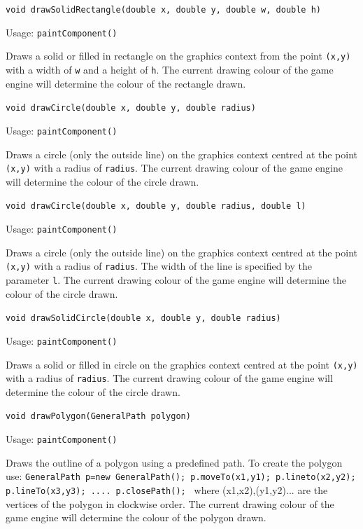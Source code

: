 \documentclass[a4paper, 10pt]{report}
\begin{document}
\hrulefill

{\large {\tt void drawSolidRectangle(double x, double y, double w, double h)}}

Usage: {\tt paintComponent()}

Draws a solid or filled in rectangle on the graphics context from the point {\tt (x,y)} with a width of {\tt w} and a height of {\tt h}. The current drawing colour of the game engine will determine the colour of the rectangle drawn.

\hrulefill

{\large {\tt void drawCircle(double x, double y, double radius)}}

Usage: {\tt paintComponent()}

Draws a circle (only the outside line) on the graphics context centred at the point {\tt (x,y)} with a radius of {\tt radius}. The current drawing colour of the game engine will determine the colour of the circle drawn.

\hrulefill

{\large {\tt void drawCircle(double x, double y, double radius, double l)}}

Usage: {\tt paintComponent()}

Draws a circle (only the outside line) on the graphics context centred at the point {\tt (x,y)} with a radius of {\tt radius}. The width of the line is specified by the parameter {\tt l}. The current drawing colour of the game engine will determine the colour of the circle drawn.


\hrulefill

{\large {\tt void drawSolidCircle(double x, double y, double radius)}}

Usage: {\tt paintComponent()}

Draws a solid or filled in circle on the graphics context centred at the point {\tt (x,y)} with a radius of {\tt radius}. The current drawing colour of the game engine will determine the colour of the circle drawn.

\hrulefill

{\large {\tt void drawPolygon(GeneralPath polygon)}}

Usage: {\tt paintComponent()}

Draws the outline of a polygon using a predefined path. To create the polygon use: {\tt GeneralPath p=new GeneralPath();
p.moveTo(x1,y1);
p.lineto(x2,y2);
p.lineTo(x3,y3);
....
p.closePath();
} where (x1,x2),(y1,y2)... are the vertices of the polygon in clockwise order. The current drawing colour of the game engine will determine the colour of the polygon drawn.
\end{document}
